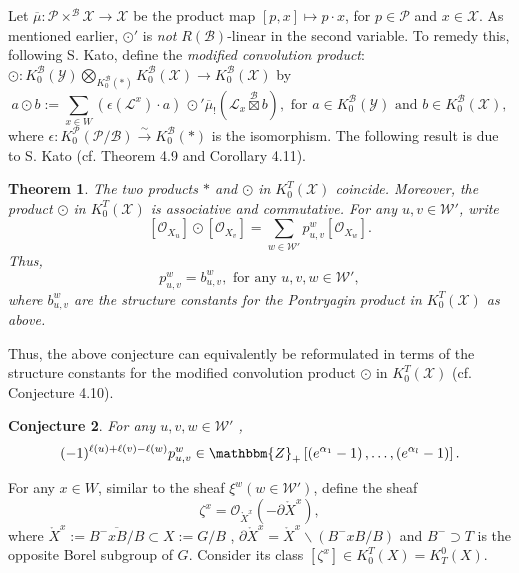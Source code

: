 \documentclass{article}
\newtheorem{theorem}{Theorem}[section]
\newtheorem{conjecture}[theorem]{Conjecture}
\def\L{\mathcal{L}}
\def\P{\mathcal{P}}
\def\X{\mathcal{X}}
\def\B{\mathcal{B}}
\def\W{\mathcal{W}}
\def\mathbb{\mathbbm}
\def\Y{\mathcal{Y}}
\def\ref#1{#1}
\begin{document}
Let $\overline{\mu}:\P\times^\B \X\rightarrow \X$ be the product map $[p,x]\mapsto p\cdot x$, for $p\in\P$ and $x\in \X$. 
As mentioned earlier, $\odot'$ is \textit{not} $R(\B)$-linear in the second variable. To remedy this,  following S. Kato,
define the \textit{modified convolution product}: 
$
\odot :K_0^\B \left( \Y\right) \bigotimes _{K_0^\B(*)} K_0^\B \left( \X\right) \rightarrow K_0^\B \left ( \X\right)
$
by 
$$
a\odot b := \sum_{x\in W} \left(\epsilon \left(\L^x\right) \cdot a\right) \, \odot' \overline{\mu}_! \left(\L_x \overset{\B}{\boxtimes} b\right), \mbox{ for  } a\in K_0^\B\left(\Y\right) \mbox{ and } b \in K_0^\B\left(\X\right),
$$
where $\epsilon:K_0^\P \left(\P/\B\right)\overset{\sim}{\rightarrow}K_0^\B (*)$ is the isomorphism.
The following result is due to S. Kato (cf. Theorem \ref{4.9} and Corollary \ref{4.11}). 
\begin{theorem}\label{1.5}
 The two products $*$ and $\odot$ in $K_0^T(\X)$ coincide.  Moreover, the product $\odot$ in $K_0^T(\X)$ is associative and commutative. 
For any $u,v\in \W'$, write 
$$
\left[\mathcal{O}_{X_u}\right] \odot \left[\mathcal{O}_{X_v}\right] = \sum_{w\in \W'} p_{u,v}^w \left[ \mathcal{O}_{X_w}\right].
$$
Thus,
$$
p_{u,v}^w = b^w_{u,v}, \mbox{ for any } u,v,w\in \W',
$$
where $b_{u,v}^w$ are the structure constants for the Pontryagin product in $K_0^T(\X)$ as above. 
\end{theorem}
Thus, the above conjecture  can equivalently be reformulated in terms of the structure constants for the modified convolution product $\odot$ in $K_0^T(\X)$ (cf. Conjecture \ref{4.10}).  
\begin{conjecture}\label{1.6}
For any $u,v,w\in \W'$ ,
$$
(-1)^{\ell(u)+\ell(v)-\ell(w)}p_{u,v}^w \in \mathbb{Z}_+ \left[\left (e^{\alpha_{1}}-1\right),\ldots , \left (e^{\alpha_{l}}-1\right)\right].
$$
\end{conjecture}

For any $x\in W$, similar to the sheaf $\xi^w\left(w\in \W'\right)$, define the sheaf 
$$
\zeta^x =\mathcal{O} _{\mathring{X}^x}\left(-\partial \mathring{X} ^x\right),
$$
where $\mathring{X}^x := \overline{B^-xB/B} \subset X:= G/B$ ,
$
\partial \mathring{X}^x = \mathring{X}^x \backslash \left( B^-xB/B\right)$ and $B^-\supset T$ is the opposite Borel subgroup of $G$.
Consider its class $\left[ \zeta^x\right]\in K_0^T (X) = K^0_T(X)$.
\end{document}
